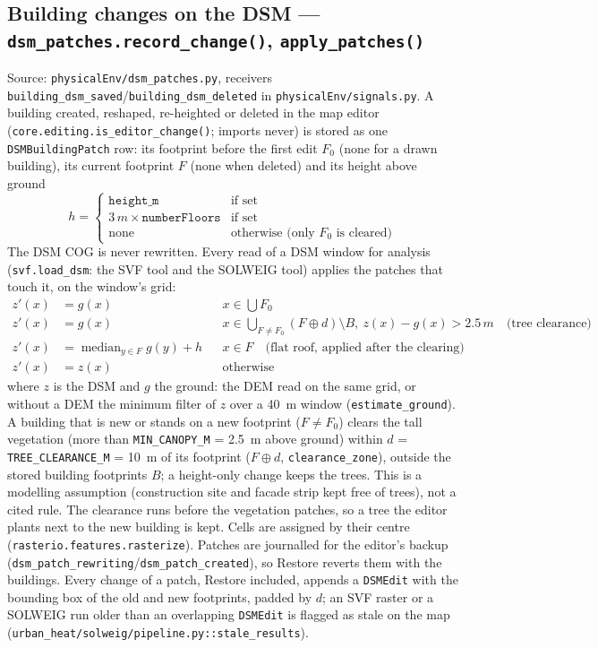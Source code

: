 \documentclass[11pt]{article}
\newcommand{\code}[1]{\texttt{#1}}
\begin{document}
\subsection{Building changes on the DSM --- \code{dsm\_patches.record\_change()}, \code{apply\_patches()}}
\label{sec:dsm-patches}
Source: \code{physicalEnv/dsm\_patches.py}, receivers \code{building\_dsm\_saved}/\code{building\_dsm\_deleted} in \code{physicalEnv/signals.py}. A building created, reshaped, re-heighted or deleted in the map editor (\code{core.editing.is\_editor\_change()}; imports never) is stored as one \code{DSMBuildingPatch} row: its footprint before the first edit $F_0$ (none for a drawn building), its current footprint $F$ (none when deleted) and its height above ground
\begin{equation}
  h = \begin{cases} \code{height\_m} & \text{if set} \\ 3\,\si{m} \times \code{numberFloors} & \text{if set} \\ \text{none} & \text{otherwise (only } F_0 \text{ is cleared)} \end{cases}
\end{equation}
The DSM COG is never rewritten. Every read of a DSM window for analysis (\code{svf.load\_dsm}: the SVF tool and the SOLWEIG tool) applies the patches that touch it, on the window's grid:
\begin{align}
  z'(x) &= g(x) && x \in \textstyle\bigcup F_0 \\
  z'(x) &= g(x) && x \in \textstyle\bigcup_{F \neq F_0} (F \oplus d) \setminus B,\ z(x) - g(x) > 2.5\,\si{m} \quad \text{(tree clearance)} \\
  z'(x) &= \operatorname{median}_{y \in F} g(y) + h && x \in F \quad \text{(flat roof, applied after the clearing)} \\
  z'(x) &= z(x) && \text{otherwise}
\end{align}
where $z$ is the DSM and $g$ the ground: the DEM read on the same grid, or without a DEM the minimum filter of $z$ over a \SI{40}{m} window (\code{estimate\_ground}). A building that is new or stands on a new footprint ($F \neq F_0$) clears the tall vegetation (more than \code{MIN\_CANOPY\_M} = \SI{2.5}{m} above ground) within $d$ = \code{TREE\_CLEARANCE\_M} = \SI{10}{m} of its footprint ($F \oplus d$, \code{clearance\_zone}), outside the stored building footprints $B$; a height-only change keeps the trees. This is a modelling assumption (construction site and facade strip kept free of trees), not a cited rule. The clearance runs before the vegetation patches, so a tree the editor plants next to the new building is kept. Cells are assigned by their centre (\code{rasterio.features.rasterize}). Patches are journalled for the editor's backup (\code{dsm\_patch\_rewriting}/\code{dsm\_patch\_created}), so Restore reverts them with the buildings. Every change of a patch, Restore included, appends a \code{DSMEdit} with the bounding box of the old and new footprints, padded by $d$; an SVF raster or a SOLWEIG run older than an overlapping \code{DSMEdit} is flagged as stale on the map (\code{urban\_heat/solweig/pipeline.py::stale\_results}).
\end{document}
